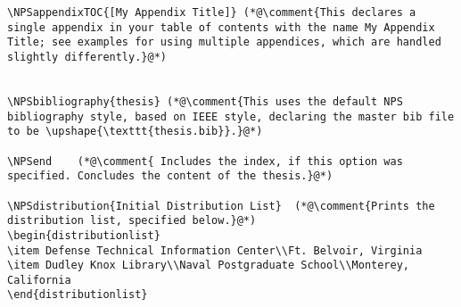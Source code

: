\begin{lstlisting}
\NPSappendixTOC{[My Appendix Title]} (*@\comment{This declares a single appendix in your table of contents with the name My Appendix Title; see examples for using multiple appendices, which are handled slightly differently.}@*)


\NPSbibliography{thesis} (*@\comment{This uses the default NPS bibliography style, based on IEEE style, declaring the master bib file to be \upshape{\texttt{thesis.bib}}.}@*)

\NPSend    (*@\comment{ Includes the index, if this option was specified. Concludes the content of the thesis.}@*)

\NPSdistribution{Initial Distribution List}  (*@\comment{Prints the distribution list, specified below.}@*)
\begin{distributionlist}
\item Defense Technical Information Center\\Ft. Belvoir, Virginia
\item Dudley Knox Library\\Naval Postgraduate School\\Monterey, California
\end{distributionlist}


\end{lstlisting}
